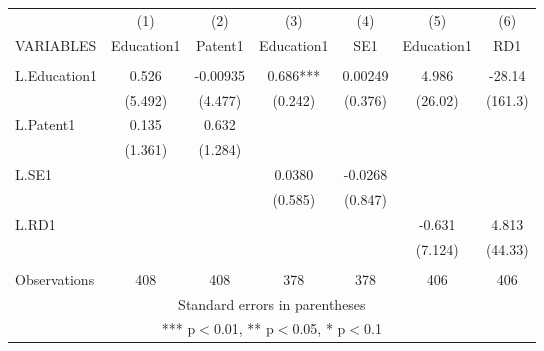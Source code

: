 \documentclass[]{article}
\begin{document}
\begin{tabular}{lcccccc} \hline
 & (1) & (2) & (3) & (4) & (5) & (6) \\
VARIABLES & Education1 & Patent1 & Education1 & SE1 & Education1 & RD1 \\ \hline
 &  &  &  &  &  &  \\
L.Education1 & 0.526 & -0.00935 & 0.686*** & 0.00249 & 4.986 & -28.14 \\
 & (5.492) & (4.477) & (0.242) & (0.376) & (26.02) & (161.3) \\
L.Patent1 & 0.135 & 0.632 &  &  &  &  \\
 & (1.361) & (1.284) &  &  &  &  \\
L.SE1 &  &  & 0.0380 & -0.0268 &  &  \\
 &  &  & (0.585) & (0.847) &  &  \\
L.RD1 &  &  &  &  & -0.631 & 4.813 \\
 &  &  &  &  & (7.124) & (44.33) \\
 &  &  &  &  &  &  \\
 Observations & 408 & 408 & 378 & 378 & 406 & 406 \\ \hline
\multicolumn{7}{c}{ Standard errors in parentheses} \\
\multicolumn{7}{c}{ *** p$<$0.01, ** p$<$0.05, * p$<$0.1} \\
\end{tabular}
\end{document}
